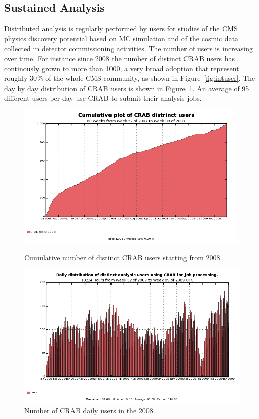 \subsection{Sustained Analysis}
\label{sec:5_2}

Distributed analysis is regularly performed by users for studies of the CMS physics discovery potential based on MC simulation and of the cosmic data collected in detector commissioning activities.
The number of users is increasing over time. For instance since 2008 the number of distinct CRAB users has continously grown to more than 1000, a very broad adoption that represent roughly 30\% of the whole CMS community, as shown in Figure~\ref{fig:intuser}.
The day by day distribution of CRAB users is shown in Figure~\ref{fig:distusers}. An average of 95 different users per day use CRAB to submit their analysis 
jobs. 

\begin{figure}
\begin{minipage}{.48\textwidth}
\centering
\includegraphics[width=0.99\textwidth]{figures/UserInteg.png}
\caption{Cumulative number of distinct CRAB users starting from 2008. }
\label{fig:intuser}
\end{minipage}
\begin{minipage}{.48\textwidth}
\centering
\includegraphics[width=1.2\textwidth]{figures/crabusersdaily.png}
\caption{Number of CRAB daily users in the 2008. }
\label{fig:distusers}
\end{minipage}
\end{figure}


